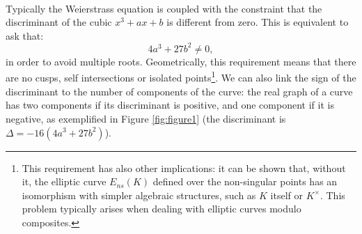 \\
Typically the Weierstrass equation is coupled with the constraint that the discriminant of the cubic $x^3 + ax + b$ is different from zero. This is equivalent to ask that:
$$4a^3 + 27b^2 \neq 0,$$ 
in order to avoid multiple roots. Geometrically, this requirement means that there are no cusps, self intersections or isolated points\footnote{This requirement has also other implications: it can be shown that, without it, the elliptic curve $E_{ns}(K)$ defined over the non-singular points has an isomorphism with simpler algebraic structures, such as $K$ itself or $K^{\times}$. This problem typically arises when dealing with elliptic curves modulo composites.}. 
We can also link the sign of the discriminant to the number of components of the curve: the real graph of a curve has two components if its discriminant is positive, and one component if it is negative, as exemplified in Figure \ref{fig:figure1} (the discriminant is $\Delta = -16(4a^3 + 27b^2)$).

